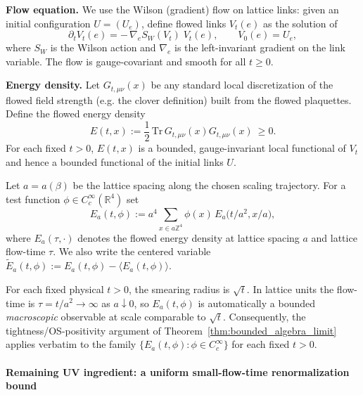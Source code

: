 \medskip
\noindent\textbf{Flow equation.}
We use the Wilson (gradient) flow on lattice links: given an initial configuration $U=(U_e)$, define flowed links $V_t(e)$ as the 
solution of
\begin{equation}\label{eq:wilson_flow}
 \partial_t V_t(e)= -\,\nabla_e S_W(V_t)\;V_t(e),\qquad V_0(e)=U_e,
\end{equation}
where $S_W$ is the Wilson action and $\nabla_e$ is the left-invariant gradient on the link variable.
The flow is gauge-covariant and smooth for all $t\ge 0$.

\medskip
\noindent\textbf{Energy density.}
Let $G_{t,\mu\nu}(x)$ be any standard local discretization of the flowed field strength (e.g. the clover definition) built from the 
flowed plaquettes. Define the flowed energy density
\begin{equation}\label{eq:flow_energy_def}
 E(t,x):=\frac{1}{2}\,\mathrm{Tr}\,G_{t,\mu\nu}(x)G_{t,\mu\nu}(x)\ \ge 0.
\end{equation}
For each fixed $t>0$, $E(t,x)$ is a bounded, gauge-invariant local functional of $V_t$ and hence a bounded functional of the initial 
links $U$.

\begin{definition}\label{def:flow_smearing}
Let $a=a(\beta)$ be the lattice spacing along the chosen scaling trajectory. For a test function $\phi\in C_c^{\infty}(\mathbb R^4)$
set
\begin{equation}\label{eq:smeared_energy_def}
 E_a(t,\phi)
 := a^4\sum_{x\in a\mathbb Z^4} \phi(x)\,E_a\bigl(t/a^2, x/a\bigr),
\end{equation}
where $E_a(\tau,\cdot)$ denotes the flowed energy density at lattice spacing $a$ and lattice flow-time $\tau$.
We also write the centered variable $\widetilde E_a(t,\phi):=E_a(t,\phi)-\langle E_a(t,\phi)\rangle$.
\end{definition}

\begin{remark}
For each fixed physical $t>0$, the smearing radius is $\sqrt t$. In lattice units the flow-time is $\tau=t/a^2\to\infty$ as 
$a\downarrow 0$, so $E_a(t,\phi)$ is automatically a bounded \emph{macroscopic} observable at scale comparable to $\sqrt t$.
Consequently, the tightness/OS-positivity argument of Theorem~\ref{thm:bounded_algebra_limit} applies verbatim to the family 
$\{E_a(t,\phi):\phi\in C_c^{\infty}\}$ for each fixed $t>0$.
\end{remark}

\paragraph*{Remaining UV ingredient: a uniform small-flow-time renormalization bound}

